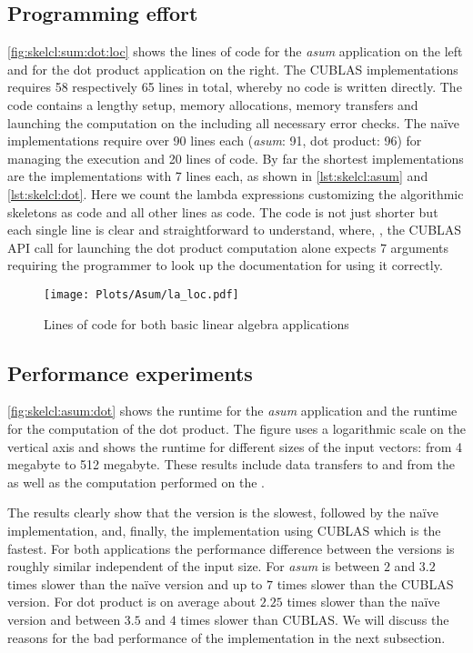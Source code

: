 \subsection*{Programming effort}
\autoref{fig:skelcl:sum:dot:loc} shows the lines of code for the \emph{asum} application on the left and for the dot product application on the right.
The CUBLAS implementations requires 58 respectively 65 lines in total, whereby no \GPU code is written directly.
The code contains a lengthy setup, memory allocations, memory transfers and launching the computation on the \GPU including all necessary error checks.
The na{\"i}ve \OpenCL implementations require over 90 lines each (\emph{asum}: 91, dot product: 96) for managing the \GPU execution and 20 lines of \GPU code.
By far the shortest implementations are the \SkelCL implementations with 7 lines each, as shown in \autoref{lst:skelcl:asum} and \autoref{lst:skelcl:dot}.
Here we count the lambda expressions customizing the algorithmic skeletons as \GPU code and all other lines as \CPU code.
The code is not just shorter but each single line is clear and straightforward to understand, where, \eg,  the CUBLAS API call for launching the dot product computation alone expects 7 arguments requiring the programmer to look up the documentation for using it correctly.

\begin{figure}
  \centering
  \texttt{[image: Plots/Asum/la\_loc.pdf]}
  \caption[Lines of code for two basic linear algebra applications]{Lines of code for both basic linear algebra applications}
  \label{fig:skelcl:sum:dot:loc}
\end{figure}

\subsection*{Performance experiments}
\autoref{fig:skelcl:asum:dot} shows the runtime for the \emph{asum} application and the runtime for the computation of the dot product.
The figure uses a logarithmic scale on the vertical axis and shows the runtime for different sizes of the input vectors: from 4 megabyte to 512 megabyte.
These results include data transfers to and from the \GPU as well as the computation performed on the \GPU.

The results clearly show that the \SkelCL version is the slowest, followed by the na{\"i}ve \OpenCL implementation, and, finally, the implementation using CUBLAS which is the fastest.
For both applications the performance difference between the versions is roughly similar independent of the input size.
For \emph{asum} \SkelCL is between $2$ and $3.2$ times slower than the na{\"i}ve \OpenCL version and up to $7$ times slower than the CUBLAS version.
For dot product \SkelCL is on average about $2.25$ times slower than the na{\"i}ve \OpenCL version and between $3.5$ and $4$ times slower than CUBLAS.
We will discuss the reasons for the bad performance of the \SkelCL implementation in the next subsection.

